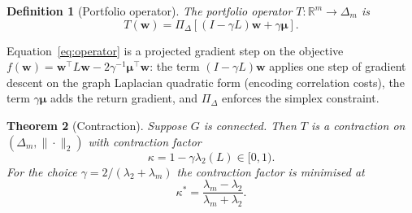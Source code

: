 \documentclass[twocolumn,11pt,a4paper]{article}
\newtheorem{theorem}{Theorem}[section]
\newtheorem{definition}[theorem]{Definition}
\theoremstyle{remark}
\newcommand{\R}{\mathbb{R}}
\newcommand{\bw}{\mathbf{w}}
\newcommand{\bmu}{\bm{\mu}}
\newcommand{\Dm}{\Delta_m}
\newcommand{\lam}[1]{\lambda_{#1}}
\newcommand{\kap}{\kappa}
\newcommand{\Proj}{\Pi_\Delta}
\begin{document}
\begin{definition}[Portfolio operator]
\label{def:operator}
The \emph{portfolio operator} $T : \R^m \to \Dm$ is
\begin{equation}
  T(\bw) = \Proj\!\left[(I - \gamma L)\bw + \gamma\bmu\right].
  \label{eq:operator}
\end{equation}
\end{definition}

Equation~\eqref{eq:operator} is a projected gradient step on the objective
$f(\bw) = \bw^\top L\bw - 2\gamma^{-1}\bmu^\top\bw$: the term $(I-\gamma L)\bw$
applies one step of gradient descent on the graph Laplacian quadratic form
(encoding correlation costs), the term $\gamma\bmu$ adds the return gradient,
and $\Proj$ enforces the simplex constraint.

\begin{theorem}[Contraction]
\label{thm:contraction}
Suppose $G$ is connected. Then $T$ is a contraction on $(\Dm,\|\cdot\|_2)$ with
contraction factor
\begin{equation}
  \kap = 1 - \gamma\lam{2}(L) \in [0,1).
  \label{eq:kappa}
\end{equation}
For the choice $\gamma = 2/(\lam{2}+\lam{m})$ the contraction factor is minimised at
\begin{equation}
  \kap^* = \frac{\lam{m}-\lam{2}}{\lam{m}+\lam{2}}.
\end{equation}
\end{theorem}
\end{document}

